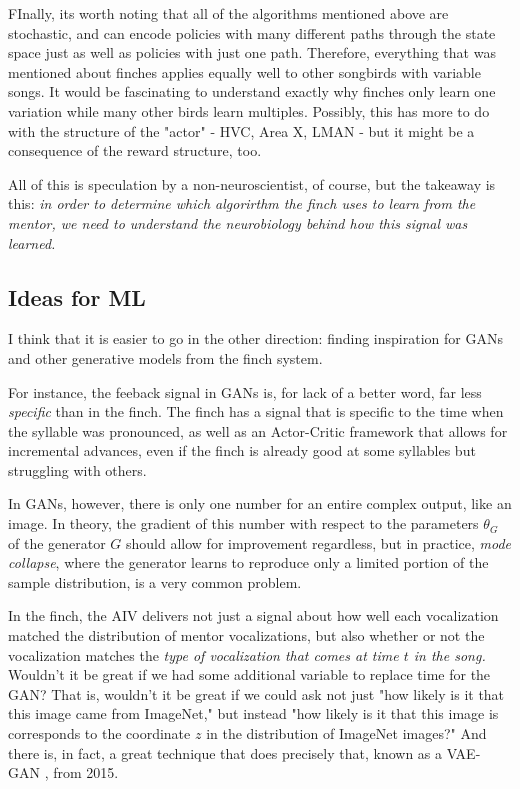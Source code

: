 \documentclass[aps,prl,preprint,groupedaddress]{revtex4-1}
\begin{document}
FInally, its worth noting that all of the algorithms mentioned above are stochastic, 
and can encode policies with many different paths through the state space just as well as policies with just one path. 
Therefore, everything that was mentioned about finches applies equally well to other songbirds with variable songs. 
It would be fascinating to understand exactly why finches only learn one variation while many other birds learn multiples. 
Possibly, this has more to do with the structure of the "actor" - HVC, Area X, LMAN - 
but it might be a consequence of the reward structure, too.

All of this is speculation by a non-neuroscientist, of course, but the takeaway is this: 
\emph{in order to determine which algorirthm the finch uses to learn from the mentor, 
we need to understand the neurobiology behind how this signal was learned.}

\subsection{Ideas for ML}

I think that it is easier to go in the other direction: finding inspiration for GANs and other generative models from the finch system. 

For instance, the feeback signal in GANs is, for lack of a better word, far less \emph{specific} than in the finch. 
The finch has a signal that is specific to the time when the syllable was pronounced, as well as an 
Actor-Critic framework that allows for incremental advances, even if the finch is already good at some syllables but struggling with others.

In GANs, however, there is only one number for an entire complex output, like an image. 
In theory, the gradient of this number with respect to the parameters $\theta_G$ of the generator $G$ 
should allow for improvement regardless, but in practice, \emph{mode collapse}, 
where the generator learns to reproduce only a limited portion of the sample distribution, is a very common problem. 

In the finch, the AIV delivers not just a signal about how well each vocalization matched the distribution of mentor vocalizations, 
but also whether or not the vocalization matches the \emph{type of vocalization that comes at time $t$ in the song.} 
Wouldn't it be great if we had some additional variable to replace time for the GAN? 
That is, wouldn't it be great if we could ask not just "how likely is it that this image came from ImageNet," 
but instead "how likely is it that this image is corresponds to the coordinate $z$ in the distribution of ImageNet images?" 
And there is, in fact, a great technique that does precisely that, known as a VAE-GAN \cite{vaegan}, from 2015. 
\end{document}
